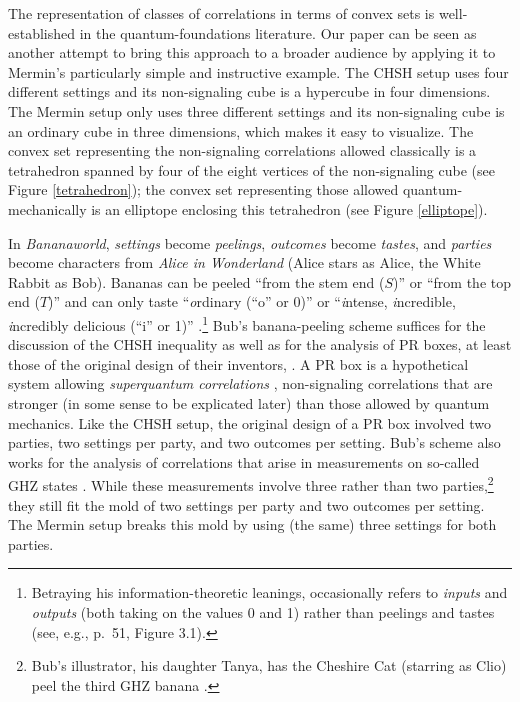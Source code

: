 The representation of classes of correlations in terms of convex sets is well-established in the quantum-foundations literature. Our paper can be seen as another attempt to bring this approach to a broader audience by applying it to Mermin's particularly simple and instructive example. The CHSH setup uses four different settings and its non-signaling cube is a hypercube in four dimensions. The Mermin setup only uses three different settings and its non-signaling cube is an ordinary cube in three dimensions, which makes it easy to visualize. The convex set representing the non-signaling correlations allowed classically is a tetrahedron spanned by four of the eight vertices of the non-signaling cube (see Figure \ref{tetrahedron}); the convex set representing those allowed quantum-mechanically is an elliptope enclosing this tetrahedron (see Figure \ref{elliptope}).  

In \emph{Bananaworld}, \emph{settings} become \emph{peelings}, \emph{outcomes} become \emph{tastes}, and \emph{parties} become characters from \emph{Alice in Wonderland} (Alice stars as Alice, the White Rabbit as Bob). Bananas can be peeled ``from the stem end ($S$)'' or ``from the top end ($T$)'' and can only taste ``\emph{o}rdinary (``o'' or 0)'' or ``\emph{i}ntense, \emph{i}ncredible,  \emph{i}ncredibly delicious (``i'' or 1)'' \citep[pp.\ 8--9, see also p.\ viii]{Bub 2016}.\footnote{Betraying his information-theoretic leanings, \citet{Bub 2016} occasionally refers to \emph{inputs} and \emph{outputs} (both taking on the values 0 and 1) rather than peelings and tastes (see, e.g., p.\ 51, Figure 3.1).} Bub's banana-peeling scheme suffices for the discussion of the CHSH inequality as well as for the analysis of PR boxes, at least those of the original design of their inventors,  \citet{Popescu and Rohrlich 1994}. A PR box is a hypothetical system allowing \emph{superquantum correlations} \citep[p.\ 106]{Bub 2016}, non-signaling correlations that are stronger 
(in some sense to be explicated later)
than those allowed by quantum mechanics. Like the CHSH setup, the original design of a PR box involved two parties, two settings per party, and two outcomes per setting. Bub's scheme also works for the analysis of correlations that arise in measurements on so-called GHZ states \citep{GHZ}. While these measurements involve three rather than two parties,\footnote{Bub's illustrator, his daughter Tanya, has the Cheshire Cat (starring as Clio) peel the third GHZ banana \citep[pp.\ 122--123, Clio and Charlie are introduced on p.\ 8]{Bub 2016}.} they still fit the mold of two settings per party and two outcomes per setting. The Mermin setup breaks this mold by using (the same) three settings for both parties. 

